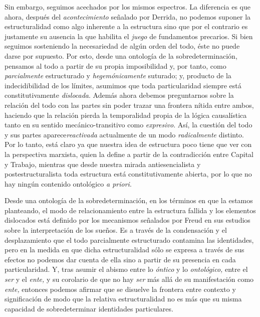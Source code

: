 Sin embargo, seguimos acechados por los mismos espectros. La diferencia es que ahora, después del \emph{acontecimiento} señalado por Derrida, no podemos suponer la estructuralidad como algo inherente a la estructura sino que por el contrario es justamente su ausencia la que habilita el \emph{juego} de fundamentos precarios. Si bien seguimos sosteniendo la necesariedad de algún orden del todo, éste no puede darse por supuesto. Por esto, desde una ontología de la sobredeterminación, pensamos al todo a partir de su propia imposibilidad y, por tanto, como \emph{parcialmente} estructurado y \emph{hegemónicamente} suturado; y, producto de la indecidibilidad de los límites, asumimos que toda particularidad siempre está constitutivamente \emph{dislocada}. Además ahora debemos preguntarnos sobre la relación del todo con las partes sin poder trazar una frontera nítida entre ambos, haciendo que la relación pierda la temporalidad propia de la lógica causalística tanto en su sentido mecánico-transitivo como \emph{expresivo}. Así, la cuestión del todo y sus partes aparece\emph{reactivada} actualmente de un modo \emph{radicalmente} distinto. Por lo tanto, está claro ya que nuestra idea de estructura poco tiene que ver con la perspectiva marxista, quien la define a partir de la contradicción entre Capital y Trabajo, mientras que desde nuestra mirada antiesencialista y postestructuralista toda estructura está constitutivamente abierta, por lo que no hay ningún contenido ontológico \emph{a priori}.

Desde una ontología de la sobredeterminación, en los términos en que la estamos planteando, el modo de relacionamiento entre la estructura fallida y los elementos dislocados está definido por los mecanismos señalados por Freud en sus estudios sobre la interpretación de los sueños. Es a través de la condensación y el desplazamiento que el todo parcialmente estructurado contamina las identidades, pero en la medida en que dicha estructuralidad sólo se expresa a través de sus efectos no podemos dar cuenta de ella sino a partir de su presencia en cada particularidad. Y, tras asumir el abismo entre lo \emph{óntico} y lo \emph{ontológico,} entre el \emph{ser} y el \emph{ente,} y su corolario de que no hay \emph{ser} más allá de su manifestación como \emph{ente,} entonces podemos afirmar que se disuelve la frontera entre contexto y significación de modo que la relativa estructuralidad no es más que su misma capacidad de sobredeterminar identidades particulares.

